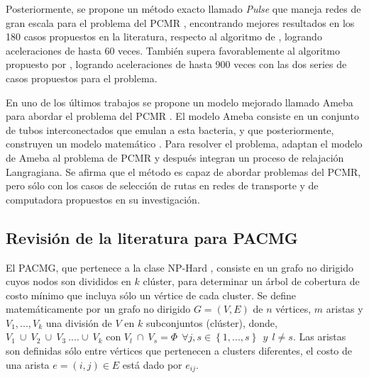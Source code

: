 Posteriormente, se propone un método exacto llamado \textit{Pulse} que maneja redes de gran escala para el problema del PCMR \citep{lozano2013exact}, encontrando mejores resultados en los 180 casos propuestos en la literatura, respecto al algoritmo de \cite{santos2007improved}, logrando aceleraciones de hasta 60 veces. También supera favorablemente al algoritmo propuesto por \cite{dumitrescu2003improved}, logrando aceleraciones de hasta 900 veces con las dos series de casos propuestos para el problema.

En uno de los últimos trabajos se propone un modelo mejorado llamado Ameba para abordar el problema del PCMR \citep{zhang2013adaptive}. El modelo Ameba consiste en un conjunto de tubos interconectados que emulan a esta bacteria, y que posteriormente, construyen un modelo matemático \citep{nakagaki2001path}. Para resolver el problema, adaptan el modelo de Ameba al problema de PCMR y después integran un proceso de relajación Langragiana. Se afirma que el método es capaz de abordar problemas del PCMR, pero sólo con los casos de selección de rutas en redes de transporte y de computadora propuestos en su investigación.



\subsection{Revisión de la literatura para PACMG}
\label{cap:rev_lit_pvv}



El PACMG, que pertenece a la clase NP-Hard \citep{dror2000generalized}, consiste en un grafo no dirigido cuyos nodos son divididos en $k$ clúster, para determinar un árbol de cobertura de costo mínimo que incluya sólo un vértice de cada cluster. Se define matemáticamente por un grafo no dirigido $G = (V,E)$ de $n$ vértices, $m$ aristas y $ V_{1},..., V_{k}$ una división de $V$ en $k$  subconjuntos (clúster), donde, $ V_{1}~\cup~V_{2}~\cup ~V_{3}~....\cup ~V_{k}$ con $ V_{l}~ \cap ~V_{s} = \Phi~~ \forall j,s \in \left \{1,...,s\right \}~~ y~~ l \neq s$. Las aristas son definidas sólo entre vértices que pertenecen a clusters diferentes, el costo de una arista $e = (i,j) \in E$ está dado por $e_{ij}$. %



